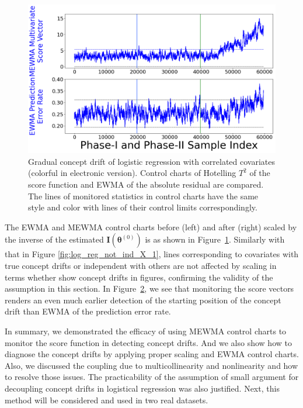 \documentclass[twoside,11pt]{article}
\begin{document}
\begin{enumerate}[(I)]
\begin{figure}[!htbp]
  \label{fig:log_reg_not_ind_X_grad_cd}
\end{figure}
\begin{figure}[!htbp]
\centering
\includegraphics[width = 0.6\linewidth, trim=0in 2.6in 0in 0in, clip]{../figures/v14/sim_7/logi_small/1_sim7_logi_1e-08_0_005_1.png}    
  \caption{Gradual concept drift of logistic regression with correlated covariates (colorful in electronic version). Control charts of Hotelling $T^2$ of the score function and EWMA of the absolute residual are compared. The lines of monitored statistics in control charts have the same style and color with lines of their control limits correspondingly.}
  \label{fig:log_reg_ind_X_grad_cd_comp}
\end{figure}

The EWMA and MEWMA control charts before (left) and after (right) scaled by {the inverse of the estimated} ${\mathbf {I}}(\bm { \theta}^{(0)})$ is as shown in Figure~\ref{fig:log_reg_not_ind_X_grad_cd}. Similarly with that in Figure \ref{fig:log_reg_not_ind_X_1}, lines corresponding to covariates with true concept drifts or independent with others are not affected by scaling in terms whether show concept drifts in figures, confirming the validity of the assumption in this section. In Figure~\ref{fig:log_reg_ind_X_grad_cd_comp}, we see that monitoring the score vectors renders an even much earlier detection of the starting position of the concept drift than EWMA of the prediction error rate.

In summary, we demonstrated the efficacy of using MEWMA control charts to monitor the score function in detecting concept drifts. And we also show how to diagnose the concept drifts by applying proper scaling and EWMA control charts. Also, we discussed the coupling due to multicollinearity and nonlinearity and how to resolve those issues. The practicability of the assumption of small argument for decoupling concept drifts in logistical regression was also justified. Next, this method will be considered and used in two real datasets.
\end{enumerate}
\end{document}
